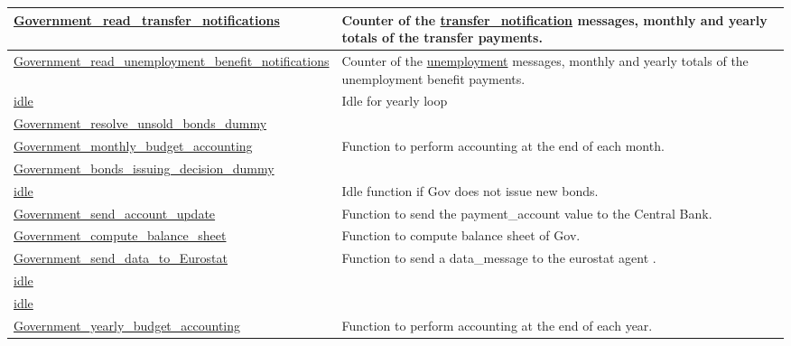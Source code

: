 \documentclass[a4paper,11pt]{article}
\begin{document}
\begin{longtable}[H!]{ll}
\midrule
\parbox{5cm}{\url{Government_read_transfer_notifications}}  & \parbox{10cm}{Counter of the \url{transfer\_notification} messages, monthly and yearly totals of the transfer payments.} \\
\midrule
\parbox{5cm}{\url{Government_read_unemployment_benefit_notifications}}  & \parbox{10cm}{Counter of the \url{unemployment} messages, monthly and yearly totals of the unemployment benefit payments.} \\
\midrule
\parbox{5cm}{\url{idle}}  & \parbox{10cm}{Idle for yearly loop} \\
\midrule
\parbox{5cm}{\url{Government_resolve_unsold_bonds_dummy}}  & \parbox{10cm}{} \\
\midrule
\parbox{5cm}{\url{Government_monthly_budget_accounting}}  & \parbox{10cm}{Function to perform accounting at the end of each month.} \\
\midrule
\parbox{5cm}{\url{Government_bonds_issuing_decision_dummy}}  & \parbox{10cm}{} \\
\midrule
\parbox{5cm}{\url{idle}}  & \parbox{10cm}{Idle function if Gov does not issue new bonds.} \\
\midrule
\parbox{5cm}{\url{Government_send_account_update}}  & \parbox{10cm}{Function to send the payment\_account value to the Central Bank.} \\
\midrule
\parbox{5cm}{\url{Government_compute_balance_sheet}}  & \parbox{10cm}{Function to compute balance sheet of Gov.} \\
\midrule
\parbox{5cm}{\url{Government_send_data_to_Eurostat}}  & \parbox{10cm}{Function to send a data\_message to the eurostat agent .} \\
\midrule
\parbox{5cm}{\url{idle}}  & \parbox{10cm}{ } \\
\midrule
\parbox{5cm}{\url{idle}}  & \parbox{10cm}{} \\
\midrule
\parbox{5cm}{\url{Government_yearly_budget_accounting}}  & \parbox{10cm}{Function to perform accounting at the end of each year.} \\
\end{longtable}
\end{document}
